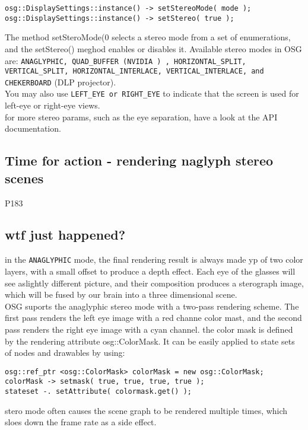 \documentclass[a4paper,12pt]{book}
\begin{document}
\begin{lstlisting}
osg::DisplaySettings::instance() -> setStereoMode( mode );
osg::DisplaySettings::instance() -> setStereo( true );
\end{lstlisting}

The method setSteroMode(0 selects a stereo mode from a set of enumerations, and the setStereo() meghod enables or disables it. Available stereo modes in OSG are: \verb|ANAGLYPHIC, QUAD_BUFFER (NVIDIA ) , HORIZONTAL_SPLIT, VERTICAL_SPLIT, HORIZONTAL_INTERLACE, VERTICAL_INTERLACE, and CHEKERBOARD| (DLP projector).\\
You may also use \verb|LEFT_EYE or RIGHT_EYE| to indicate that the screen is used for left-eye or right-eye views.\\
for more stereo params, such as the eye separation, have a look at the API documentation.

\subsection{Time for action - rendering naglyph stereo scenes}
P183

\subsection{wtf just happened?}
in the \verb|ANAGLYPHIC| mode, the final rendering result is always made yp of two color layers, with a small offset to produce a depth effect. Each eye of the glasses will see aslightly different picture, and their composition produces a sterograph image, which will be fused by our brain into a three dimensional scene.\\
OSG suports the anaglyphic stereo mode with a two-pass rendering scheme. The first pass renders the left eye image with a red channe color mast, and the second pass renders the right eye image with a cyan channel. the color mask is defined by the rendering attribute osg::ColorMask. It can be easily applied to state sets of nodes and drawables by using:

\begin{lstlisting}
osg::ref_ptr <osg::ColorMask> colorMask = new osg::ColorMask;
colorMask -> setmask( true, true, true, true );
stateset -. setAttribute( colormask.get() );
\end{lstlisting}

stero mode often causes the scene graph to be rendered multiple times, which sloes down the frame rate as a side effect.
\end{document}
